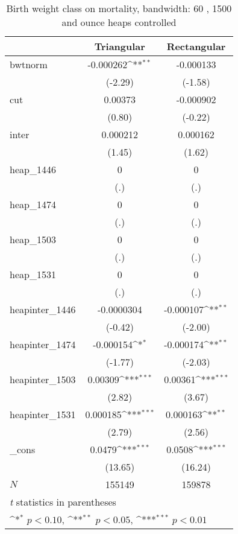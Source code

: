 \begin{table}[htbp]\centering
\def\sym#1{\ifmmode^{#1}\else\(^{#1}\)\fi}
\caption{Birth weight class on mortality, bandwidth: 60 , 1500 and ounce heaps controlled}
\begin{tabular}{l*{2}{c}}
\hline\hline
            &\multicolumn{1}{c}{Triangular}&\multicolumn{1}{c}{Rectangular}\\
\hline
bwtnorm     &   -0.000262\sym{**} &   -0.000133         \\
            &     (-2.29)         &     (-1.58)         \\
[1em]
cut         &     0.00373         &   -0.000902         \\
            &      (0.80)         &     (-0.22)         \\
[1em]
inter       &    0.000212         &    0.000162         \\
            &      (1.45)         &      (1.62)         \\
[1em]
heap\_1446   &           0         &           0         \\
            &         (.)         &         (.)         \\
[1em]
heap\_1474   &           0         &           0         \\
            &         (.)         &         (.)         \\
[1em]
heap\_1503   &           0         &           0         \\
            &         (.)         &         (.)         \\
[1em]
heap\_1531   &           0         &           0         \\
            &         (.)         &         (.)         \\
[1em]
heapinter\_1446&  -0.0000304         &   -0.000107\sym{**} \\
            &     (-0.42)         &     (-2.00)         \\
[1em]
heapinter\_1474&   -0.000154\sym{*}  &   -0.000174\sym{**} \\
            &     (-1.77)         &     (-2.03)         \\
[1em]
heapinter\_1503&     0.00309\sym{***}&     0.00361\sym{***}\\
            &      (2.82)         &      (3.67)         \\
[1em]
heapinter\_1531&    0.000185\sym{***}&    0.000163\sym{**} \\
            &      (2.79)         &      (2.56)         \\
[1em]
\_cons      &      0.0479\sym{***}&      0.0508\sym{***}\\
            &     (13.65)         &     (16.24)         \\
\hline
\(N\)       &      155149         &      159878         \\
\hline\hline
\multicolumn{3}{l}{\footnotesize \textit{t} statistics in parentheses}\\
\multicolumn{3}{l}{\footnotesize \sym{*} \(p<0.10\), \sym{**} \(p<0.05\), \sym{***} \(p<0.01\)}\\
\end{tabular}
\end{table}

